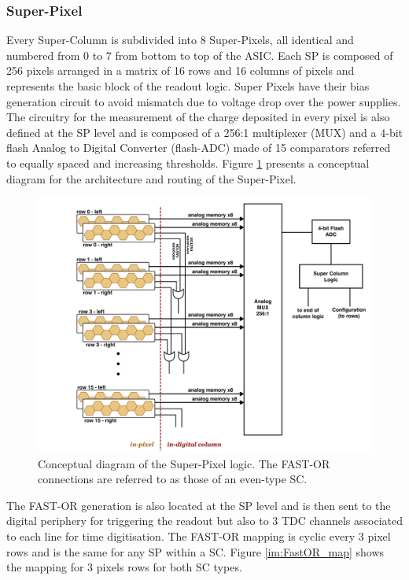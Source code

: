 			\subsubsection{Super-Pixel} 
			Every Super-Column is subdivided into 8 Super-Pixels, all identical and numbered from 0 to 7 from bottom to top of the ASIC. Each SP is composed of 256 pixels arranged in a matrix of 16 rows and 16 columns of pixels and represents the basic block of the readout logic. Super Pixels have their bias generation circuit to avoid mismatch due to voltage drop over the power supplies. The circuitry for the measurement of the charge deposited in every pixel is also defined at the SP level and is composed of a 256:1 multiplexer (MUX) and a 4-bit flash Analog to Digital Converter (flash-ADC) made of 15 comparators referred to equally spaced and increasing thresholds. Figure \ref{im:SuperPixel_logic} presents a conceptual diagram for the architecture and routing of the Super-Pixel. 
			\begin{figure}[h]
				\centering
				\includegraphics[width=1.0\textwidth]{files/SuperPixel_logic}
				\caption{Conceptual diagram of the Super-Pixel logic. The FAST-OR connections are referred to as those of an even-type SC. }
				\label{im:SuperPixel_logic}
			\end{figure}
			
			 The FAST-OR generation is also located at the SP level and is then sent to the digital periphery for triggering the readout but also to 3 TDC channels associated to each line for time digitisation. The FAST-OR mapping is cyclic every 3 pixel rows and is the same for any SP within a SC. Figure \ref{im:FastOR_map} shows the mapping for 3 pixels rows for both SC types. 
			
